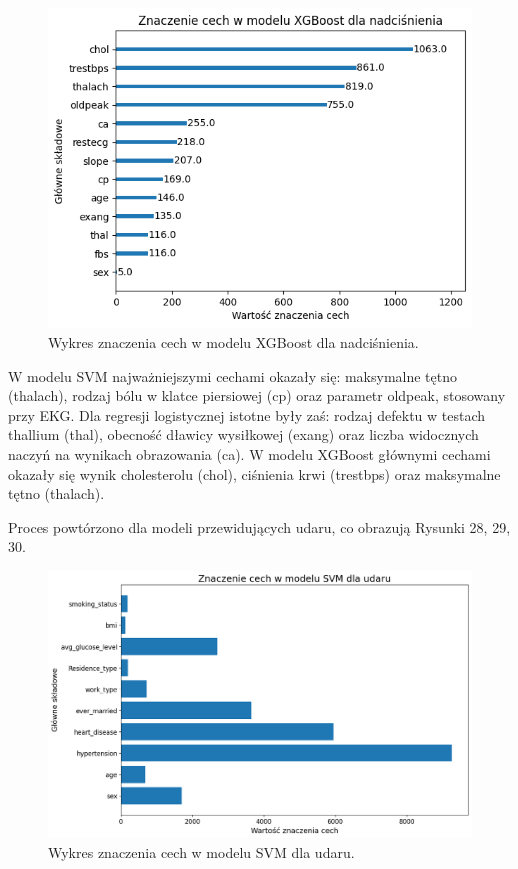\documentclass[onecolumn,12pt]{article}
\begin{document}
\begin{figure}[H]
    \centering
    \includegraphics[width=0.90\linewidth]{raport/graphs/nadcisnienie_xgb.png}
    \captionsetup{justification=centering}
    \caption{Wykres znaczenia cech w modelu XGBoost dla nadciśnienia.}
\end{figure}

\newpage
\noindent
W modelu SVM najważniejszymi cechami okazały się: maksymalne tętno (thalach), rodzaj bólu w klatce piersiowej (cp) oraz parametr oldpeak, stosowany przy EKG. Dla regresji logistycznej istotne były zaś: rodzaj defektu w testach thallium (thal), obecność dławicy wysiłkowej (exang) oraz liczba widocznych naczyń na wynikach obrazowania (ca). W modelu XGBoost głównymi cechami okazały się wynik cholesterolu (chol), ciśnienia krwi (trestbps) oraz maksymalne tętno (thalach).

\vspace{8pt}
\noindent
Proces powtórzono dla modeli przewidujących udaru, co obrazują Rysunki 28, 29, 30.

\begin{figure}[H]
    \centering
    \includegraphics[width=0.90\linewidth]{raport/graphs/udar_svm.png}
    \captionsetup{justification=centering}
    \caption{Wykres znaczenia cech w modelu SVM dla udaru.}
\end{figure}
\end{document}

